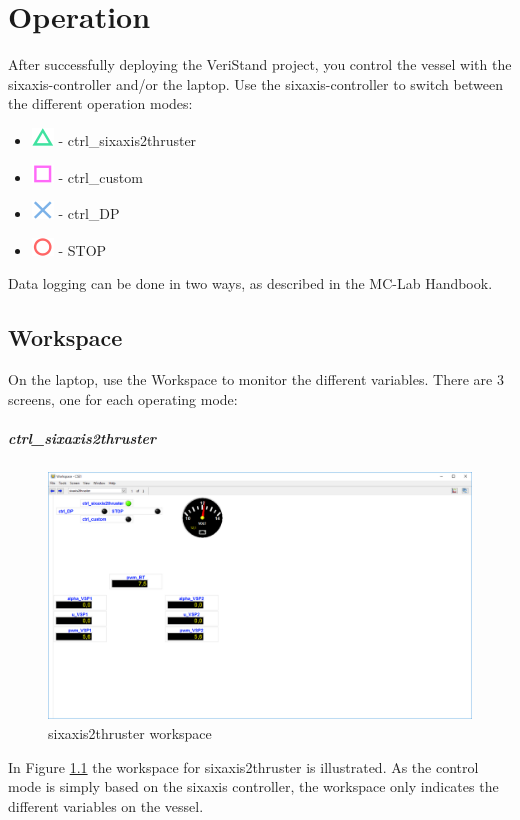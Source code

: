 \chapter{Operation}
After successfully deploying the VeriStand project, you control the vessel with the sixaxis-controller and/or the laptop. Use the sixaxis-controller to switch between the different operation modes:
\begin{itemize}
	\item \includegraphics[scale=0.5]{fig/sixaxis_triangle.png} - ctrl\_sixaxis2thruster
	\item \includegraphics[scale=0.5]{fig/sixaxis_square.png} - ctrl\_custom
	\item \includegraphics[scale=0.5]{fig/sixaxis_cross.png} - ctrl\_DP
	\item \includegraphics[scale=0.5]{fig/sixaxis_circle.png} - STOP
\end{itemize}
Data logging can be done in two ways, as described in the MC-Lab Handbook. 
\section{Workspace}
On the laptop, use the Workspace to monitor the different variables. There are 3 screens, one for each operating mode: 
\paragraph{ctrl\_sixaxis2thruster}
\begin{figure}[htb!]
	\centering
	\includegraphics[width=\linewidth]{fig/CSE1_workspace_sixaxis2thruster.png}
	\caption{sixaxis2thruster workspace}
	\label{fig:workspace_sixaxis2thruster}
\end{figure}
In Figure \ref{fig:workspace_sixaxis2thruster} the workspace for sixaxis2thruster is illustrated. As the control mode is simply based on the sixaxis controller, the workspace only indicates the different variables on the vessel. 
